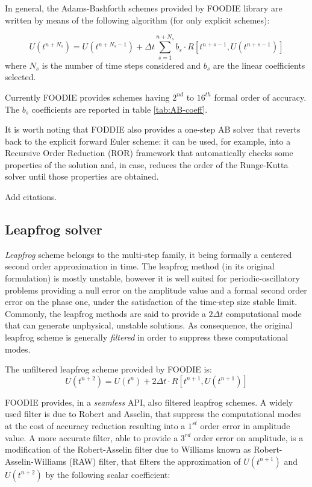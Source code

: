 In general, the Adams-Bashforth schemes provided by FOODIE library are written by means of the following algorithm (for only explicit schemes):

\begin{equation}
U\left(t^{n+N_s}\right) = U\left(t^{n+N_s-1}\right) +\Delta t \sum_{s=1}^{n+N_s}{ b_s \cdot R\left[t^{n+s-1}, U\left(t^{n+s-1}\right)\right]}
\label{eq:AB}
\end{equation}
where $N_s$ is the number of time steps considered and $b_s$ are the linear coefficients selected.

Currently FOODIE provides schemes having $2^{nd}$ to $16^{th}$ formal order of accuracy. The $b_s$ coefficients are reported in table \ref{tab:AB-coeff}.

It is worth noting that FODDIE also provides a one-step AB solver that reverts back to the explicit forward Euler scheme: it can be used, for example, into a Recursive Order Reduction (ROR) framework that automatically checks some properties of the solution and, in case, reduces the order of the Runge-Kutta solver until those properties are obtained.

{\color{red} Add citations.}

\subsection{Leapfrog solver}

\emph{Leapfrog} scheme belongs to the multi-step family, it being formally a centered second order approximation in time. The leapfrog method (in its original formulation) is mostly unstable, however it is well suited for periodic-oscillatory problems providing a null error on the amplitude value and a formal second order error on the phase one, under the satisfaction of the time-step size stable limit. Commonly, the leapfrog methods are said to provide a $2 \Delta t$ computational mode that can generate unphysical, unstable solutions. As consequence, the original leapfrog scheme is generally \emph{filtered} in order to suppress these computational modes.

The unfiltered leapfrog scheme provided by FOODIE is:
\begin{equation}
  U\left(t^{n+2}\right) = U\left(t^{n}\right) + 2\Delta t \cdot R\left[t^{n+1}, U\left(t^{n+1}\right)\right]
\label{eq:leapfrog}
\end{equation}

FOODIE provides, in a \emph{seamless} API, also filtered leapfrog schemes. A widely used filter is due to Robert and Asselin, that suppress the computational modes at the cost of accuracy reduction resulting into a $1^{st}$ order error in amplitude value. A more accurate filter, able to provide a $3^{rd}$ order error on amplitude, is a modification of the Robert-Asselin filter due to Williams known as Robert-Asselin-Williams (RAW) filter, that filters the approximation of $U\left(t^{n+1}\right)$ and $U\left(t^{n+2}\right)$ by the following scalar coefficient:

